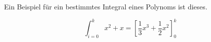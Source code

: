 \documentclass{article}
\begin{document}
  Ein Beispiel für ein bestimmtes Integral eines Polynoms ist dieses.

  \begin{displaymath}
    \int_{i=0}^k
      x^2 + x =
      \left[
        \frac{1}{3} x^3 + \frac{1}{2} x^2
      \right]_0^k
  \end{displaymath}
\end{document}
